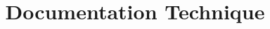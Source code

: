 \documentclass{rapport}
\title{Documentation Technique}
\begin{document}
    
    \tableofcontents
  
	\begin{sloppypar}
	  		
	  	
	  			
	  			
		
	\end{sloppypar}
\end{document}
